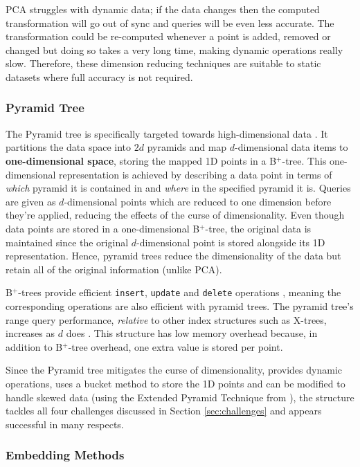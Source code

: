 PCA struggles with dynamic data; if the data changes then the computed transformation will go out of sync and queries will be even less accurate. The transformation could be re-computed whenever a point is added, removed or changed but doing so takes a very long time, making dynamic operations really slow. Therefore, these dimension reducing techniques are suitable to static datasets where full accuracy is not required.

\subsubsection{Pyramid Tree}
\label{sec:pyramid-tree}

The Pyramid tree is specifically targeted towards high-dimensional data \cite{pyramid-tree}. It partitions the data space into $2d$ pyramids and map $d$-dimensional data items to \textbf{one-dimensional space}, storing the mapped 1D points in a B${}^{+}$-tree. This one-dimensional representation is achieved by describing a data point in terms of \textit{which} pyramid it is contained in and \textit{where} in the specified pyramid it is. Queries are given as $d$-dimensional points which are reduced to one dimension before they're applied, reducing the effects of the curse of dimensionality. Even though data points are stored in a one-dimensional B${}^{+}$-tree, the original data is maintained since the original $d$-dimensional point is stored alongside its 1D representation. Hence, pyramid trees reduce the dimensionality of the data but retain all of the original information (unlike PCA).

B${}^{+}$-trees provide efficient \texttt{insert}, \texttt{update} and \texttt{delete} operations \cite{ubiquitous-btree}, meaning the corresponding operations are also efficient with pyramid trees. The pyramid tree's range query performance, \textit{relative} to other index structures such as X-trees, increases as $d$ does \cite{pyramid-tree}. This structure has low memory overhead because, in addition to B${}^{+}$-tree overhead, one extra value is stored per point.

Since the Pyramid tree mitigates the curse of dimensionality, provides dynamic operations, uses a bucket method to store the 1D points and can be modified to handle skewed data (using the Extended Pyramid Technique from \cite{pyramid-tree}), the structure tackles all four challenges discussed in Section \ref{sec:challenges} and appears successful in many respects.

\subsubsection{Embedding Methods}

